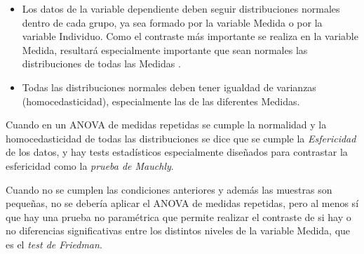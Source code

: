\begin{itemize}
\item Los datos de la variable dependiente deben seguir distribuciones normales dentro de cada grupo, ya sea formado por
la variable Medida o por la variable Individuo. Como el contraste más importante se realiza en la variable Medida,
resultará especialmente importante que sean normales las distribuciones de todas las Medidas .

\item Todas las distribuciones normales deben tener igualdad de varianzas (homocedasticidad), especialmente las de las
diferentes Medidas.
\end{itemize}

Cuando en un ANOVA de medidas repetidas se cumple la normalidad y la homocedasticidad de todas las distribuciones se
dice que se cumple la \emph{Esfericidad} de los datos, y hay tests estadísticos especialmente diseñados para contrastar
la esfericidad como la \emph{prueba de Mauchly}.

Cuando no se cumplen las condiciones anteriores y además las muestras son pequeñas, no se debería aplicar el ANOVA de
medidas repetidas, pero al menos sí que hay una prueba no paramétrica que permite realizar el contraste de si hay o no
diferencias significativas entre los distintos niveles de la variable Medida, que es el \emph{test de Friedman}.



